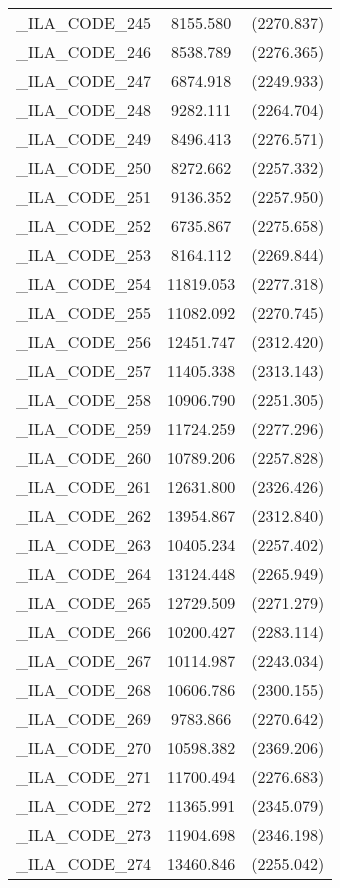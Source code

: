 {\begin{table}[htbp]
\begin{tabular}{l c c }
\_ILA\_CODE\_245  &  8155.580  & (2270.837)\\
\_ILA\_CODE\_246  &  8538.789  & (2276.365)\\
\_ILA\_CODE\_247  &  6874.918  & (2249.933)\\
\_ILA\_CODE\_248  &  9282.111  & (2264.704)\\
\_ILA\_CODE\_249  &  8496.413  & (2276.571)\\
\_ILA\_CODE\_250  &  8272.662  & (2257.332)\\
\_ILA\_CODE\_251  &  9136.352  & (2257.950)\\
\_ILA\_CODE\_252  &  6735.867  & (2275.658)\\
\_ILA\_CODE\_253  &  8164.112  & (2269.844)\\
\_ILA\_CODE\_254  &  11819.053  & (2277.318)\\
\_ILA\_CODE\_255  &  11082.092  & (2270.745)\\
\_ILA\_CODE\_256  &  12451.747  & (2312.420)\\
\_ILA\_CODE\_257  &  11405.338  & (2313.143)\\
\_ILA\_CODE\_258  &  10906.790  & (2251.305)\\
\_ILA\_CODE\_259  &  11724.259  & (2277.296)\\
\_ILA\_CODE\_260  &  10789.206  & (2257.828)\\
\_ILA\_CODE\_261  &  12631.800  & (2326.426)\\
\_ILA\_CODE\_262  &  13954.867  & (2312.840)\\
\_ILA\_CODE\_263  &  10405.234  & (2257.402)\\
\_ILA\_CODE\_264  &  13124.448  & (2265.949)\\
\_ILA\_CODE\_265  &  12729.509  & (2271.279)\\
\_ILA\_CODE\_266  &  10200.427  & (2283.114)\\
\_ILA\_CODE\_267  &  10114.987  & (2243.034)\\
\_ILA\_CODE\_268  &  10606.786  & (2300.155)\\
\_ILA\_CODE\_269  &  9783.866  & (2270.642)\\
\_ILA\_CODE\_270  &  10598.382  & (2369.206)\\
\_ILA\_CODE\_271  &  11700.494  & (2276.683)\\
\_ILA\_CODE\_272  &  11365.991  & (2345.079)\\
\_ILA\_CODE\_273  &  11904.698  & (2346.198)\\
\_ILA\_CODE\_274  &  13460.846  & (2255.042)\\

\end{tabular}
\end{table}}

